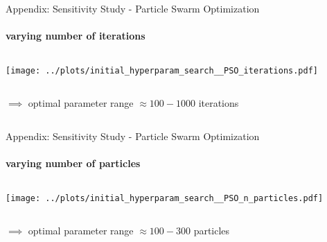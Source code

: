 \documentclass[11pt,aspectratio=169]{beamer}
\begin{document}
%
%
\begin{closingframe}{Appendix: Sensitivity Study - Particle Swarm Optimization}
    \framesubtitle{varying \textbf{number of iterations}}

    \begin{columns}
    \begin{column}{0.8\textwidth}
        \texttt{[image: ../plots/initial\_hyperparam\_search\_\_PSO\_iterations.pdf]}
    \end{column}
    \end{columns}

    \begin{columns}
        \begin{column}{0.8\textwidth}
            $\implies$ optimal parameter range $\approx 100-1000$ iterations
        \end{column}
        \begin{column}{0.1\textwidth}
            \tiny{}
        \end{column}
    \end{columns}
\end{closingframe}

%
%

\begin{closingframe}{Appendix: Sensitivity Study - Particle Swarm Optimization}
    \framesubtitle{varying \textbf{number of particles}}

    \begin{columns}
    \begin{column}{0.8\textwidth}
        \texttt{[image: ../plots/initial\_hyperparam\_search\_\_PSO\_n\_particles.pdf]}
    \end{column}
    \end{columns}

    \begin{columns}
        \begin{column}{0.8\textwidth}
            $\implies$ optimal parameter range $\approx 100-300$ particles
        \end{column}
        \begin{column}{0.1\textwidth}
            \tiny{}
        \end{column}
    \end{columns}
\end{closingframe}
\end{document}
